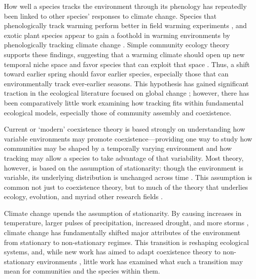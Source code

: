 \documentclass[11pt,letterpaper]{article}
\begin{document}
How well a species tracks the environment through its phenology has repeatedly been linked to other species' responses to climate change. Species that phenologically track warming perform better in field warming experiments \citep{Cleland:2012}, and exotic plant species appear to gain a foothold in warming environments by phenologically tracking climate change \citep{Willis:2010al}. Simple community ecology theory supports these findings, suggesting that a warming climate should open up new temporal niche space and favor species that can exploit that space \citep{gotelli1996,wolkovich:2010fee,Zettlemoyer2019}. Thus, a shift toward earlier spring should favor earlier species, especially those that can environmentally track ever-earlier seasons. This hypothesis has gained significant traction in the ecological literature focused on global change \citep[e.g.,][]{Cleland:2012,Zettlemoyer2019}; however, there has been comparatively little work examining how tracking fits within fundamental ecological models, especially those of community assembly and coexistence. %

Current or `modern' coexistence theory is based strongly on understanding how variable environments may promote coexistence---providing one way to study how communities may be shaped by a temporally varying environment and how tracking may allow a species to take advantage of that variability. Most theory, however, is based on the assumption of stationarity: though the environment is variable, its underlying distribution is unchanged across time \citep[i.e., constant mean and variance,][]{barabas2018}. This assumption is common not just to coexistence theory, but to much of the theory that underlies ecology, evolution, and myriad other research fields \citep[e.g.,][]{Milly:2008yu,nosenko2013}. 

Climate change upends the assumption of stationarity. By causing increases in temperature, larger pulses of precipitation, increased drought, and more storms \citep{ipcc2013}, climate change has fundamentally shifted major attributes of the environment from stationary to non-stationary regimes. This transition is reshaping ecological systems, and, while new work has aimed to adapt coexistence theory to non-stationary environments \citep{chessonnonstat}, little work has examined what such a transition may mean for communities and the species within them.  %
\end{document}

